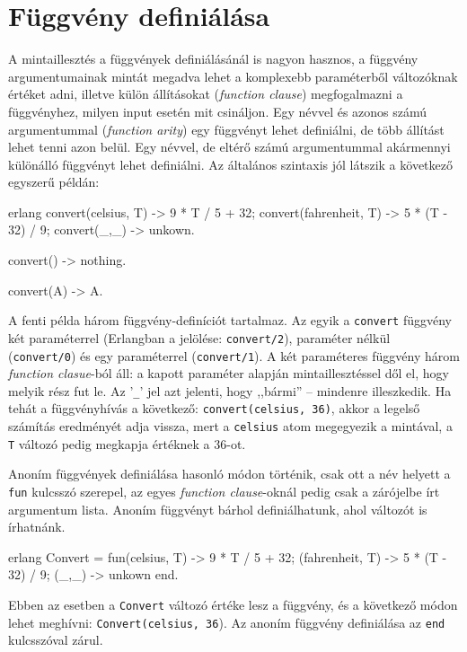 \documentclass[12pt, a4paper, oneside]{book}
\begin{document}
\section{Függvény definiálása} A mintaillesztés a függvények definiálásánál
is nagyon hasznos, a függvény argumentumainak mintát megadva lehet a komplexebb
paraméterből változóknak értéket adni, illetve külön állításokat
(\emph{function clause}) megfogalmazni a függvényhez, milyen input esetén mit
csináljon. Egy névvel és azonos számú argumentummal (\emph{function arity})
egy függvényt lehet definiálni, de több állítást lehet tenni azon belül. Egy
névvel, de eltérő számú argumentummal akármennyi különálló függvényt lehet
definiálni. Az általános szintaxis jól látszik a következő egyszerű példán:

\begin{code}{erlang}{}
convert(celsius, T) ->
  9 * T / 5 + 32;
convert(fahrenheit, T) ->
  5 * (T - 32) / 9;
convert(_,_) ->
  unkown.

convert() ->
  nothing.

convert(A) ->
  A.
\end{code}

A fenti példa három függvény-definíciót tartalmaz. Az egyik a \texttt{convert}
függvény két paraméterrel (Erlangban a jelölése: \texttt{convert/2}), paraméter
nélkül (\texttt{convert/0}) és egy paraméterrel (\texttt{convert/1}). A két
paraméteres függvény három \emph{function clasue}-ból áll: a kapott paraméter
alapján mintaillesztéssel dől el, hogy melyik rész fut le. Az '\texttt{\_}' jel
azt jelenti, hogy ,,bármi'' -- mindenre illeszkedik. Ha tehát a függvényhívás a
következő: \texttt{convert(celsius, 36)}, akkor a legelső számítás eredményét
adja vissza, mert a \texttt{celsius} atom megegyezik a mintával, a \texttt{T}
változó pedig megkapja értéknek a 36-ot.

Anoním függvények definiálása hasonló módon történik, csak ott a név helyett a
\texttt{fun} kulcsszó szerepel, az egyes \emph{function clause}-oknál pedig
csak a zárójelbe írt argumentum lista. Anoním függvényt bárhol definiálhatunk,
ahol változót is írhatnánk.

\begin{code}{erlang}{}
Convert = fun(celsius, T) ->
                  9 * T / 5 + 32;
             (fahrenheit, T) ->
                  5 * (T - 32) / 9;
             (_,_) ->
                  unkown
          end.
\end{code}

Ebben az esetben a \texttt{Convert} változó értéke lesz a függvény, és a következő módon
lehet meghívni: \texttt{Convert(celsius, 36}). Az anoním függvény definiálása
az \texttt{end} kulcsszóval zárul.
\end{document}
